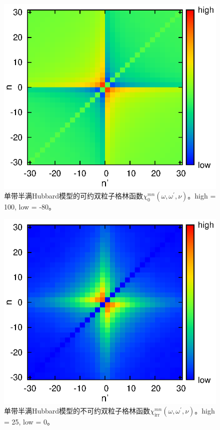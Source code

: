 \begin{figure}
\centering
\includegraphics[scale=1.05]{figure/v_0.eps}
\caption[可约双粒子格林函数$\chi^{mn}_{0}(\omega,\omega^{\prime},\nu)$]
{单带半满Hubbard模型的可约双粒子格林函数$\chi^{mn}_{0}(\omega,\omega^{\prime},\nu)$。high = 100, low = -80。} 
\label{fig:v_0}
\end{figure}

\begin{figure}
\centering
\includegraphics[scale=1.05]{figure/v_i.eps}
\caption[不可约双粒子格林函数$\chi^{mn}_{\text{irr}}(\omega,\omega^{\prime},\nu)$]
{单带半满Hubbard模型的不可约双粒子格林函数$\chi^{mn}_{\text{irr}}(\omega,\omega^{\prime},\nu)$。high = 25, low = 0。} 
\label{fig:v_i}
\end{figure}


